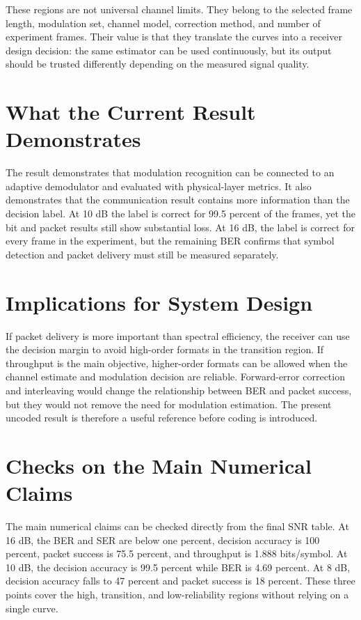 \documentclass[12pt,twoside,openright]{report}
\begin{document}
These regions are not universal channel limits. They belong to the selected
frame length, modulation set, channel model, correction method, and number
of experiment frames. Their value is that they translate the curves into a
receiver design decision: the same estimator can be used continuously, but
its output should be trusted differently depending on the measured signal
quality.

\section{What the Current Result Demonstrates}
The result demonstrates that modulation recognition can be connected to an
adaptive demodulator and evaluated with physical-layer metrics. It also
demonstrates that the communication result contains more information than
the decision label. At 10 dB the label is correct for 99.5 percent of the
frames, yet the bit and packet results still show substantial loss. At
16 dB, the label is correct for every frame in the experiment, but the
remaining BER confirms that symbol detection and packet delivery must still
be measured separately.

\section{Implications for System Design}
If packet delivery is more important than spectral efficiency, the receiver
can use the decision margin to avoid high-order formats in the transition
region. If throughput is the main objective, higher-order formats can be
allowed when the channel estimate and modulation decision are reliable.
Forward-error correction and interleaving would change the relationship
between BER and packet success, but they would not remove the need for
modulation estimation. The present uncoded result is therefore a useful
reference before coding is introduced.

\section{Checks on the Main Numerical Claims}
The main numerical claims can be checked directly from the final SNR table.
At 16 dB, the BER and SER are below one percent, decision accuracy is
100 percent, packet success is 75.5 percent, and throughput is 1.888
bits/symbol. At 10 dB, the decision accuracy is 99.5 percent while BER is
4.69 percent. At 8 dB, decision accuracy falls to 47 percent and packet
success is 18 percent. These three points cover the high, transition, and
low-reliability regions without relying on a single curve.
\end{document}
